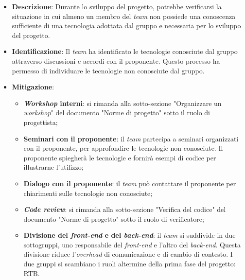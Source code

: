 \label{risk:conoscenza tecnologie carente}
\begin{itemize}
	\item \textbf{Descrizione}:
		Durante lo sviluppo del progetto, potrebbe verificarsi la situazione 
		in cui almeno un membro del \textit{team} non possiede una conoscenza 
		sufficiente di una tecnologia adottata dal gruppo e necessaria per 
		lo sviluppo del progetto.

	\item \textbf{Identificazione}: 
		Il \textit{team} ha identificato le tecnologie conosciute dal gruppo 
		attraverso discussioni e accordi con il proponente. 
		Questo processo ha permesso di individuare le tecnologie non conosciute dal gruppo.

	\item \textbf{Mitigazione}:
	      \begin{itemize}
		      \item \textbf{\textit{Workshop} interni}: si rimanda alla
		            sotto-sezione "Organizzare un \textit{workshop}" del
		            documento "Norme di progetto" sotto il ruolo di progettista;

		      \item \textbf{Seminari con il proponente}: il \textit{team}
		            partecipa a seminari organizzati con il proponente, per approfondire
		            le tecnologie non conosciute. 
					Il proponente spiegherà le tecnologie e fornirà esempi di codice
		            per illustrarne l'utilizzo;

		      \item \textbf{Dialogo con il proponente}: il \textit{team} può
		            contattare il proponente per chiarimenti sulle
		            tecnologie non conosciute;

		      \item \textbf{\textit{Code review}}: si rimanda alla sotto-sezione
		            "Verifica del codice" del documento "Norme di progetto"
		            sotto il ruolo di verificatore;

		      \item \textbf{Divisione del \textit{front-end} e del \textit{back-end}}: 
			  		il \textit{team} si suddivide in due sottogruppi, uno responsabile del 
					\textit{front-end} e l'altro del \textit{back-end}. 
					Questa divisione riduce l'\textit{overhead} di comunicazione e di cambio di
		            contesto. I due gruppi si scambiano i ruoli altermine della prima 
					fase del progetto: RTB.
	      \end{itemize}
\end{itemize}
